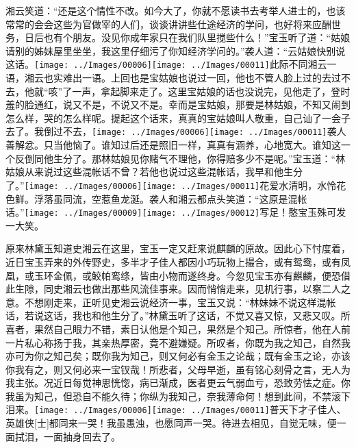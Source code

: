 湘云笑道：``还是这个情性不改。如今大了，你就不愿读书去考举人进士的，也该常常的会会这些为官做宰的人们，谈谈讲讲些仕途经济的学问，也好将来应酬世务，日后也有个朋友。没见你成年家只在我们队里搅些什么！''宝玉听了道：``姑娘请别的姊妹屋里坐坐，我这里仔细污了你知经济学问的。''袭人道：``云姑娘快别说这话。{\texttt{[image: ../Images/00006]}\texttt{[image: ../Images/00011]}\footnotesize \kaishu 此际不同湘云一语，湘云也实难出一语。}上回也是宝姑娘也说过一回，他也不管人脸上过的去过不去，他就``咳''了一声，拿起脚来走了。这里宝姑娘的话也没说完，见他走了，登时羞的脸通红，说又不是，不说又不是。幸而是宝姑娘，那要是林姑娘，不知又闹到怎么样，哭的怎么样呢。提起这个话来，真真的宝姑娘叫人敬重，自己讪了一会子去了。我倒过不去，{\texttt{[image: ../Images/00006]}\texttt{[image: ../Images/00011]}\footnotesize \kaishu 袭人善解忿。}只当他恼了。谁知过后还是照旧一样，真真有涵养，心地宽大。谁知这一个反倒同他生分了。那林姑娘见你赌气不理他，你得赔多少不是呢。''宝玉道：``林姑娘从来说过这些混帐话不曾？若他也说过这些混帐话，我早和他生分了。''{\texttt{[image: ../Images/00006]}\texttt{[image: ../Images/00011]}\footnotesize \kaishu 花爱水清明，水怜花色鲜。浮落虽同流，空惹鱼龙涎。}袭人和湘云都点头笑道：``这原是混帐话。''{\texttt{[image: ../Images/00009]}\texttt{[image: ../Images/00012]}\footnotesize \kaishu 写足！憨宝玉殊可发一大笑。}

原来林黛玉知道史湘云在这里，宝玉一定又赶来说麒麟的原故。因此心下忖度着，近日宝玉弄来的外传野史，多半才子佳人都因小巧玩物上撮合，或有鸳鸯，或有凤凰，或玉环金佩，或鲛帕鸾绦，皆由小物而遂终身。今忽见宝玉亦有麒麟，便恐借此生隙，同史湘云也做出那些风流佳事来。因而悄悄走来，见机行事，以察二人之意。不想刚走来，正听见史湘云说经济一事，宝玉又说：``林妹妹不说这样混帐话，若说这话，我也和他生分了。''林黛玉听了这话，不觉又喜又惊，又悲又叹。所喜者，果然自己眼力不错，素日认他是个知己，果然是个知己。所惊者，他在人前一片私心称扬于我，其亲热厚密，竟不避嫌疑。所叹者，你既为我之知己，自然我亦可为你之知己矣；既你我为知己，则又何必有金玉之论哉；既有金玉之论，亦该你我有之，则又何必来一宝钗哉！所悲者，父母早逝，虽有铭心刻骨之言，无人为我主张。况近日每觉神思恍惚，病已渐成，医者更云气弱血亏，恐致劳怯之症。你我虽为知己，但恐自不能久待；你纵为我知己，奈我薄命何！想到此间，不禁滚下泪来。{\texttt{[image: ../Images/00006]}\texttt{[image: ../Images/00011]}\footnotesize \kaishu 普天下才子佳人、英雄侠{[}士{]}都同来一哭！我虽愚浊，也愿同声一哭。}待进去相见，自觉无味，便一面拭泪，一面抽身回去了。

